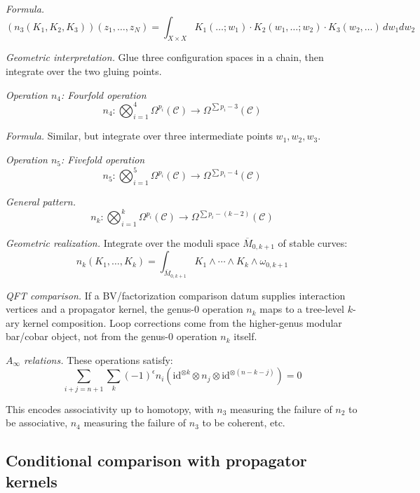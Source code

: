 \begin{example}
\emph{Formula.}
\[(n_3(K_1, K_2, K_3))(z_1, \ldots, z_N) = \int_{X \times X} K_1(\ldots; w_1) \cdot
K_2(w_1, \ldots; w_2) \cdot K_3(w_2, \ldots) \, dw_1 dw_2\]

\emph{Geometric interpretation.} Glue three configuration spaces in a chain,
then integrate over the two gluing points.

\emph{Operation $n_4$: Fourfold operation}
\[n_4: \bigotimes_{i=1}^4 \Omega^{p_i}(\mathcal{C}) \to \Omega^{\sum p_i - 3}(\mathcal{C})\]

\emph{Formula.} Similar, but integrate over three intermediate points $w_1, w_2, w_3$.

\emph{Operation $n_5$: Fivefold operation}
\[n_5: \bigotimes_{i=1}^5 \Omega^{p_i}(\mathcal{C}) \to \Omega^{\sum p_i - 4}(\mathcal{C})\]

\emph{General pattern.}
\[n_k: \bigotimes_{i=1}^k \Omega^{p_i}(\mathcal{C}) \to \Omega^{\sum p_i - (k-2)}(\mathcal{C})\]

\emph{Geometric realization.} Integrate over the moduli space $\overline{M}_{0,k+1}$
of stable curves:
\[n_k(K_1, \ldots, K_k) = \int_{\overline{M}_{0,k+1}} K_1 \wedge \cdots \wedge K_k
\wedge \omega_{0,k+1}\]

\emph{QFT comparison.} If a BV/factorization comparison datum supplies
interaction vertices and a propagator kernel, the genus-$0$ operation
$n_k$ maps to a tree-level $k$-ary kernel composition. Loop corrections
come from the higher-genus modular bar/cobar object, not from the
genus-$0$ operation $n_k$ itself.

\emph{$A_\infty$ relations.} These operations satisfy:
\[\sum_{i+j=n+1} \sum_{k} (-1)^{\epsilon} n_i(\text{id}^{\otimes k} \otimes n_j
\otimes \text{id}^{\otimes (n-k-j)}) = 0\]

This encodes associativity up to homotopy, with $n_3$ measuring the failure of
$n_2$ to be associative, $n_4$ measuring the failure of $n_3$ to be coherent, etc.
\end{example}

\subsection{Conditional comparison with propagator kernels}

